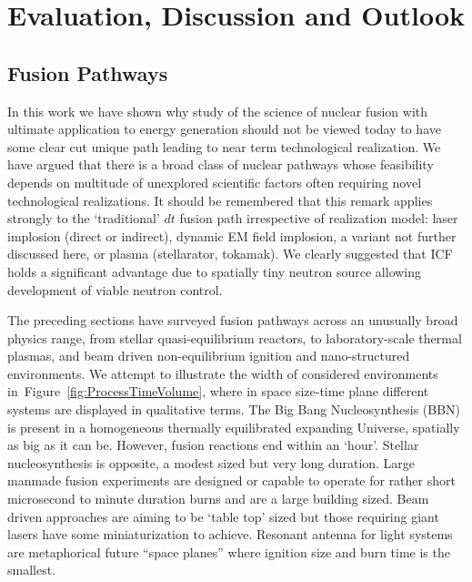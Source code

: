 \documentclass[particles,article,accept,pdftex,moreauthors]{Definitions/mdpi}
\begin{document}
\section{Evaluation, Discussion and Outlook}\label{sec:Dis}
\subsection{Fusion Pathways}
In this work we have shown why study of the science of nuclear fusion with ultimate application to energy generation should not be viewed today to have some clear cut unique path leading to near term technological realization. We have argued that there is a broad class of nuclear pathways whose feasibility depends on multitude of unexplored scientific factors often requiring novel technological realizations. It should be remembered that this remark applies strongly to the `traditional' $dt$ fusion path irrespective of realization model: laser implosion (direct or indirect), dynamic EM field implosion, a variant not further discussed here, or plasma (stellarator, tokamak). We clearly suggested that ICF holds a significant advantage due to spatially tiny neutron source allowing development of viable neutron control. 

The preceding sections have surveyed fusion pathways across an unusually broad physics range, from stellar quasi-equilibrium reactors, to laboratory-scale thermal plasmas, and beam driven non-equilibrium ignition and nano-structured environments. We attempt to illustrate the width of considered environments in~Figure~\ref{fig:ProcessTimeVolume}, where in space size-time plane different systems are displayed in qualitative terms. The Big Bang Nucleosynthesis (BBN) is present in a homogeneous thermally equilibrated expanding Universe, spatially as big as it can be. However, fusion reactions end within an `hour'. Stellar nucleosynthesis is opposite, a modest sized but very long duration. Large manmade fusion experiments are designed or capable to operate for rather short microsecond to minute duration burns and are a large building sized. Beam driven approaches are aiming to be `table top' sized but those requiring giant lasers have some miniaturization to achieve. Resonant antenna for light systems are metaphorical future ``space planes'' where ignition size and burn time is the smallest. 
\end{document}
